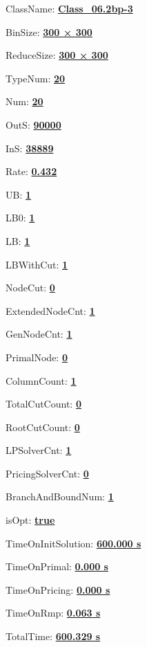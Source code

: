 \documentclass[11pt]{article}
\begin{document}
\pagestyle{empty}


ClassName: \underline{\textbf{Class_06.2bp-3}}
\par
BinSize: \underline{\textbf{300 × 300}}
\par
ReduceSize: \underline{\textbf{300 × 300}}
\par
TypeNum: \underline{\textbf{20}}
\par
Num: \underline{\textbf{20}}
\par
OutS: \underline{\textbf{90000}}
\par
InS: \underline{\textbf{38889}}
\par
Rate: \underline{\textbf{0.432}}
\par
UB: \underline{\textbf{1}}
\par
LB0: \underline{\textbf{1}}
\par
LB: \underline{\textbf{1}}
\par
LBWithCut: \underline{\textbf{1}}
\par
NodeCut: \underline{\textbf{0}}
\par
ExtendedNodeCnt: \underline{\textbf{1}}
\par
GenNodeCnt: \underline{\textbf{1}}
\par
PrimalNode: \underline{\textbf{0}}
\par
ColumnCount: \underline{\textbf{1}}
\par
TotalCutCount: \underline{\textbf{0}}
\par
RootCutCount: \underline{\textbf{0}}
\par
LPSolverCnt: \underline{\textbf{1}}
\par
PricingSolverCnt: \underline{\textbf{0}}
\par
BranchAndBoundNum: \underline{\textbf{1}}
\par
isOpt: \underline{\textbf{true}}
\par
TimeOnInitSolution: \underline{\textbf{600.000 s}}
\par
TimeOnPrimal: \underline{\textbf{0.000 s}}
\par
TimeOnPricing: \underline{\textbf{0.000 s}}
\par
TimeOnRmp: \underline{\textbf{0.063 s}}
\par
TotalTime: \underline{\textbf{600.329 s}}
\par
\newpage
\end{document}
